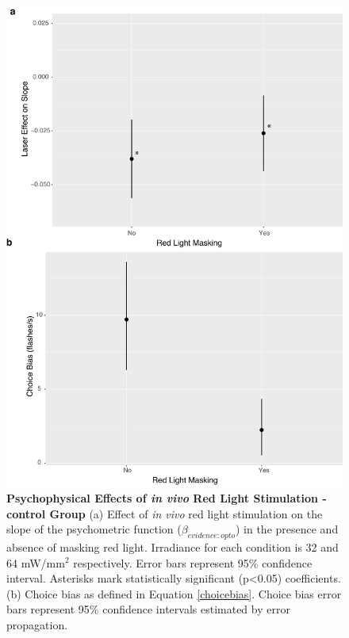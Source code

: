\begin{figure}
  \centering
   \includegraphics[width=\textwidth,height=0.8\textheight,keepaspectratio]{Figures/chapter4/glmm_pmf_effects_controls.png}
  \caption[Psychophysical Effects of \emph{in vivo} red light stimulation on control group]{\textbf{Psychophysical Effects of \emph{in vivo} Red Light Stimulation - control Group} (a) Effect of \emph{in vivo} red light stimulation on the slope of the psychometric function ($\beta_{evidence:opto}$) in the presence and absence of masking red light. Irradiance for each condition is 32 and 64 mW/mm$^{2}$ respectively. Error bars represent 95\% confidence interval. Asterisks mark statistically significant (p<0.05) coefficients. (b) Choice bias as defined in Equation \ref{choicebias}. Choice bias error bars represent 95\% confidence intervals estimated by error propagation.}
   \label{fig:glmmcontrol}
\end{figure}
